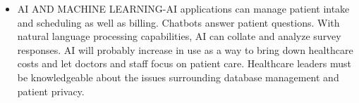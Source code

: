 \documentclass[12 pt]{article}
\begin{document}
\begin{itemize}
\item
AI AND MACHINE LEARNING-AI applications can manage patient intake and scheduling as well as billing. Chatbots answer patient questions. With natural language processing capabilities, AI can collate and analyze survey responses. AI will probably increase in use as a way to bring down healthcare costs and let doctors and staff focus on patient care. Healthcare leaders must be knowledgeable about the issues surrounding database management and patient privacy. 

\end{itemize}
\end{document}
